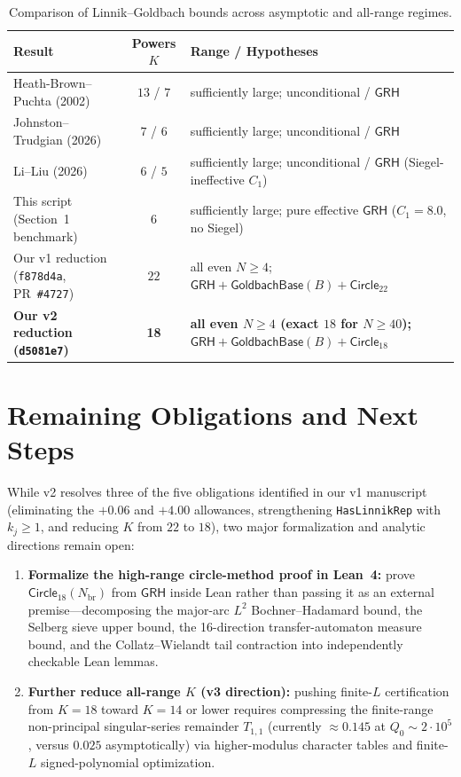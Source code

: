 \documentclass[11pt,a4paper]{article}
\newcommand{\GoldbachBase}{\mathsf{GoldbachBase}}
\newcommand{\Circle}[1]{\mathsf{Circle}_{#1}}
\newcommand{\GRH}{\mathsf{GRH}}
\begin{document}
\begin{table}[ht]
\centering
\caption{Comparison of Linnik--Goldbach bounds across asymptotic and all-range regimes.}
\label{tab:comp}
\footnotesize
\begin{tabularx}{\textwidth}{@{}l c X@{}}
\toprule
Result & Powers $K$ & Range / Hypotheses \\
\midrule
Heath-Brown--Puchta (2002)~\cite{HBP2002} & $13$ / $7$ & sufficiently large; unconditional / $\GRH$ \\
Johnston--Trudgian (2026)~\cite{JT2026} & $7$ / $6$ & sufficiently large; unconditional / $\GRH$ \\
Li--Liu (2026)~\cite{LL2026} & $6$ / $5$ & sufficiently large; unconditional / $\GRH$ (Siegel-ineffective $C_1$) \\
This script (Section~1 benchmark) & $6$ & sufficiently large; pure effective $\GRH$ ($C_1 = 8.0$, no Siegel) \\
Our v1 reduction (\texttt{f878d4a}, PR~\texttt{\#4727}) & $22$ & all even $N \ge 4$; $\GRH + \GoldbachBase(B) + \Circle{22}$ \\
\textbf{Our v2 reduction (\texttt{d5081e7})} & \textbf{18} & \textbf{all even $N \ge 4$ (exact $18$ for $N \ge 40$); $\GRH + \GoldbachBase(B) + \Circle{18}$} \\
\bottomrule
\end{tabularx}
\end{table}

\section{Remaining Obligations and Next Steps}

While v2 resolves three of the five obligations identified in our v1 manuscript (eliminating the $+0.06$ and $+4.00$ allowances, strengthening \texttt{HasLinnikRep} with $k_j \ge 1$, and reducing $K$ from $22$ to $18$), two major formalization and analytic directions remain open:
\begin{enumerate}[leftmargin=2em,itemsep=2pt]
  \item \textbf{Formalize the high-range circle-method proof in Lean~4:} prove $\Circle{18}(N_{\mathrm{br}})$ from $\GRH$ inside Lean rather than passing it as an external premise—decomposing the major-arc $L^2$ Bochner--Hadamard bound, the Selberg sieve upper bound, the 16-direction transfer-automaton measure bound, and the Collatz--Wielandt tail contraction into independently checkable Lean lemmas.
  \item \textbf{Further reduce all-range $K$ (v3 direction):} pushing finite-$L$ certification from $K = 18$ toward $K = 14$ or lower requires compressing the finite-range non-principal singular-series remainder $T_{1,1}$ (currently $\approx 0.145$ at $Q_0 \sim 2\cdot 10^5$, versus $0.025$ asymptotically) via higher-modulus character tables and finite-$L$ signed-polynomial optimization.
\end{enumerate}
\end{document}
